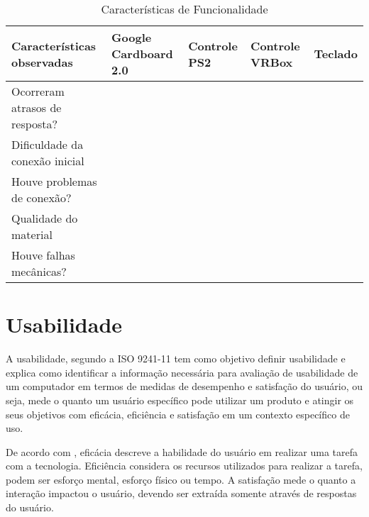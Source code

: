 \begin{longtable}{p{2.8cm}|p{2.8cm}|p{2.8cm}|p{2.8cm}|p{2.8cm}}	
    \caption{Características de Funcionalidade} \\
    \label{t.funcionalidade} 
	\textbf{\small Características observadas } & \textbf{\small Google Cardboard 2.0} & \textbf{\small Controle PS2} & \textbf{\small Controle VRBox} & \textbf{\small Teclado } \\\hline
	
	{\small Ocorreram atrasos de resposta?} & {\small } & {\small } & {\small } & {\small } \\\hline	
		 
	{\small Dificuldade da conexão inicial} & {\small } & {\small } & {\small } & {\small } \\\hline		 
	
	{\small Houve problemas de conexão?} & {\small } & {\small } & {\small } & {\small } \\\hline  
			 
	{\small Qualidade do material} & {\small } & {\small } & {\small } & {\small } \\\hline
	
    {\small Houve falhas mecânicas?} & {\small } & {\small } &{\small } & {\small }\\\hline
	
\end{longtable}
	
\section{Usabilidade}

A usabilidade, segundo a ISO 9241-11 \cite{iso9241} tem como objetivo definir usabilidade e explica como identificar a informação necessária para avaliação de usabilidade de um computador em termos de medidas de desempenho e satisfação do usuário, ou seja, mede o quanto um usuário específico pode utilizar um produto e atingir os seus objetivos com eficácia, eficiência e satisfação em um contexto específico de uso.

De acordo com , eficácia descreve a habilidade do usuário em realizar uma tarefa com a tecnologia. Eficiência considera os recursos utilizados para realizar a tarefa, podem ser esforço mental, esforço físico ou tempo. A satisfação mede o quanto a interação impactou o usuário, devendo ser extraída somente através de respostas do usuário. 


